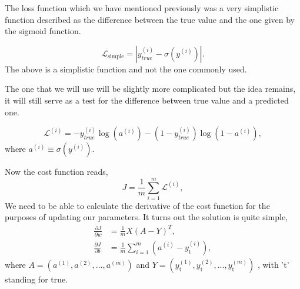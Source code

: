 The loss function which we have mentioned previously was a very simplistic
function described as the difference between the true value and the one
given by the sigmoid function.

\begin{equation}
    \mathscr{L}_{\text{simple}} = |y_{true}^{(i)} - \sigma(y^{(i)}) |.
\end{equation}
The above is a simplistic function and not the one commonly used.

The one that we will use will be slightly more complicated but 
the idea remains, it will still serve as a test for the difference
between true value and a predicted one.

\begin{equation}
    \mathscr{L}^{(i)} = -y_{true}^{(i)} \log (a^{(i)}) - (1 - y_{true}^{(i)})
    \log(1 - a^{(i)}),
\end{equation}
where $a^{(i)} \equiv \sigma(y^{(i)})$.

Now the cost function reads,
\begin{equation}
    J = \frac{1}{m} \sum_{i=1}^m \mathscr{L}^{(i)},
\end{equation}
We need to be able to calculate the derivative of the cost function
for the purposes of updating our parameters.
It turns out the solution is quite simple,
\begin{align}
    \frac{\partial J}{\partial w} &= 
    \frac{1}{m}  X(A - Y)^T, \\
    \frac{\partial J}{\partial b} &=
    \frac{1}{m}
    \sum_{i=1}^m (a^{(i)} - y^{(i)}_{\text{t}}),
\end{align}
where 
$A = (a^{(1)}, a^{(2)},...,a^{(m)})$
and
$Y = (y^{(1)}_{\text{t}}, y^{(2)}_{\text{t}},..., y^{(m)}_{\text{t}})$
, with 't' standing
for true.
